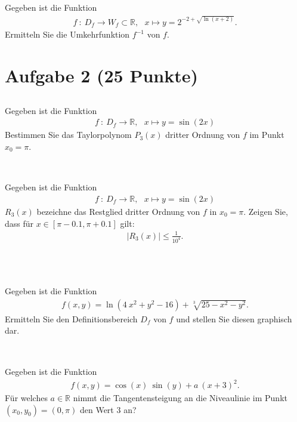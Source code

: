 \subsection*{}
Gegeben ist die Funktion
\begin{align*}
f \ : \ D_f \to W_f \subset \mathbb{R}, \ \ \
x \mapsto y = 2^{-2 + \sqrt{\ln(x+2)}}. 
\end{align*}
Ermitteln Sie die Umkehrfunktion $f^{-1}$ von $f$.
\newpage
\section*{Aufgabe 2 (25 Punkte)}
\subsection*{}
Gegeben ist die Funktion
\begin{align*}
f \ : \ D_f \to \mathbb{R}, \ \ \
x \mapsto y = \sin(2x) 
\end{align*}
Bestimmen Sie das Taylorpolynom $P_3(x)$ dritter Ordnung von $f$ im Punkt $x_0 = \pi$.
\ \\
\\
\subsection*{}
Gegeben ist die Funktion
\begin{align*}
f \ : \ D_f \to \mathbb{R}, \ \ \
x \mapsto y = \sin(2x) 
\end{align*}
$R_3(x)$ bezeichne das Restglied dritter Ordnung von $f$ in $x_0= \pi$.
Zeigen Sie, dass für $x \in [\pi -0.1, \pi+0.1]$ gilt:
\begin{align*}
|R_3(x)| \leq \frac{1}{10^4}.
\end{align*}
\ \\
\\
\subsection*{}
Gegeben ist die Funktion
\begin{align*}
f(x,y) = 
\ln(4 \ x^2 + y^2- 16) + \sqrt[3]{25 - x^2 - y^2}. 
\end{align*}
Ermitteln Sie den Definitionsbereich $D_f$ von $f$
und stellen Sie diesen graphisch dar.
\ \\
\\
\subsection*{}
Gegeben ist die Funktion
\begin{align*}
f(x,y) = \cos(x) \ \sin(y) + a \ (x+3)^2.
\end{align*}
Für welches $a \in \mathbb{R}$ nimmt die Tangentensteigung
an die Niveaulinie im Punkt $(x_0,y_0) = ( 0, \pi) $
den Wert $3$ an?
\ \\
\\
